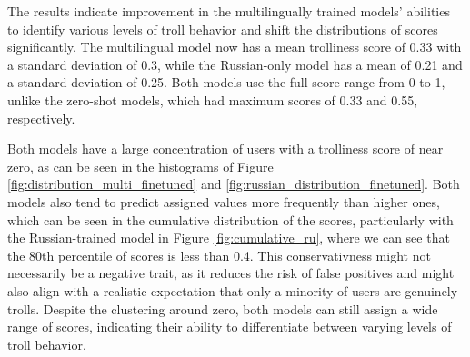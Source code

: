 \documentclass[twoside]{ctuthesis}
\theoremstyle{plain}
\theoremstyle{definition}
\theoremstyle{note}
\begin{document}
The results indicate improvement in the multilingually trained models' abilities to identify various levels of troll behavior and shift the distributions of scores significantly. The multilingual model now has a mean trolliness score of 0.33 with a standard deviation of 0.3, while the Russian-only model has a mean of 0.21 and a standard deviation of 0.25. Both models use the full score range from 0 to 1, unlike the zero-shot models, which had maximum scores of 0.33 and 0.55, respectively.\par

Both models have a large concentration of users with a trolliness score of near zero, as can be seen in the histograms of Figure \ref{fig:distribution_multi_finetuned} and \ref{fig:russian_distribution_finetuned}. Both models also tend to predict assigned values more frequently than higher ones, which can be seen in the cumulative distribution of the scores, particularly with the Russian-trained model in Figure \ref{fig:cumulative_ru}, where we can see that the 80th percentile of scores is less than 0.4. This conservativness might not necessarily be a negative trait, as it reduces the risk of false positives and might also align with a realistic expectation that only a minority of users are genuinely trolls. Despite the clustering around zero, both models can still assign a wide range of scores, indicating their ability to differentiate between varying levels of troll behavior.\par
\end{document}
